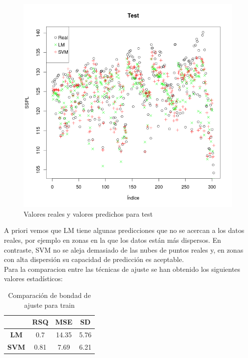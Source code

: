 \begin{figure}[H]
\centering
\includegraphics[scale=0.40]{predicciones_test.png}
\caption{Valores reales y valores predichos para test}
\label{}
\end{figure}

A priori vemos que LM tiene algunas predicciones que no se acercan a los datos reales, por ejemplo en zonas en la que los datos están más dispersos. En contraste, SVM no se aleja demasiado de las nubes de puntos reales y, en zonas con alta dispersión su capacidad de predicción es aceptable.\\



Para la comparacion entre las técnicas de ajuste se han obtenido los siguientes valores estadísticos:

\begin{table}[H]
\label{vetrain}
\begin{center}\begin{tabular}{|c|c|c|c|}
\hline
	 & \textbf{RSQ} & \textbf{MSE} & \textbf{SD}\\
\hline
	\textbf{LM} & 0.7 & 14.35 & 5.76\\
\hline
	\textbf{SVM} & 0.81 & 7.69 & 6.21\\
\hline
\end{tabular}\end{center}\centering
\caption{Comparación de bondad de ajuste para train}
\end{table}

